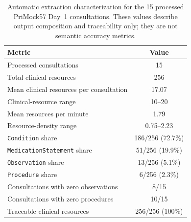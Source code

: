 \begin{table}[ht]
\centering
\caption{Automatic extraction characterization for the 15 processed PriMock57 Day~1 consultations. These values describe output composition and traceability only; they are not semantic accuracy metrics.}
\label{tab:extraction-characterization-summary}
\begin{tabular}{lc}
\hline
Metric & Value \\
\hline
Processed consultations & 15 \\
Total clinical resources & 256 \\
Mean clinical resources per consultation & 17.07 \\
Clinical-resource range & 10--20 \\
Mean resources per minute & 1.79 \\
Resource-density range & 0.75--2.23 \\
\texttt{Condition} share & 186/256 (72.7\%) \\
\texttt{MedicationStatement} share & 51/256 (19.9\%) \\
\texttt{Observation} share & 13/256 (5.1\%) \\
\texttt{Procedure} share & 6/256 (2.3\%) \\
Consultations with zero observations & 8/15 \\
Consultations with zero procedures & 10/15 \\
Traceable clinical resources & 256/256 (100\%) \\
\hline
\end{tabular}
\end{table}
